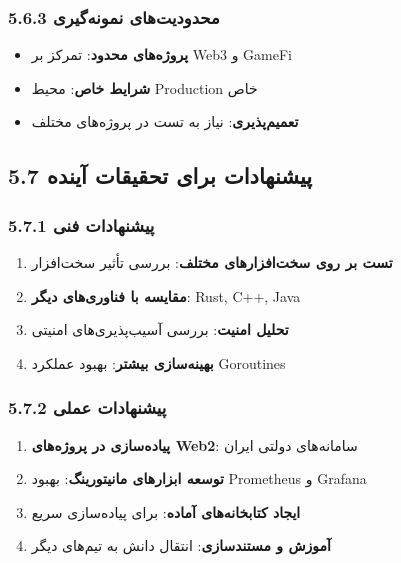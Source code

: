 \documentclass[
]{article}
\providecommand{\tightlist}{%
  \setlength{\itemsep}{0pt}\setlength{\parskip}{0pt}}
\begin{document}
\subsubsection{5.6.3 محدودیت‌های
نمونه‌گیری}\label{ux645ux62dux62fux648ux62fux6ccux62aux647ux627ux6cc-ux646ux645ux648ux646ux647ux6afux6ccux631ux6cc}

\begin{itemize}
\tightlist
\item
  \textbf{پروژه‌های محدود}: تمرکز بر Web3 و GameFi
\item
  \textbf{شرایط خاص}: محیط Production خاص
\item
  \textbf{تعمیم‌پذیری}: نیاز به تست در پروژه‌های مختلف
\end{itemize}

\subsection{5.7 پیشنهادات برای تحقیقات
آینده}\label{ux67eux6ccux634ux646ux647ux627ux62fux627ux62a-ux628ux631ux627ux6cc-ux62aux62dux642ux6ccux642ux627ux62a-ux622ux6ccux646ux62fux647}

\subsubsection{5.7.1 پیشنهادات
فنی}\label{ux67eux6ccux634ux646ux647ux627ux62fux627ux62a-ux641ux646ux6cc}

\begin{enumerate}
\def\labelenumi{\arabic{enumi}.}
\tightlist
\item
  \textbf{تست بر روی سخت‌افزارهای مختلف}: بررسی تأثیر سخت‌افزار
\item
  \textbf{مقایسه با فناوری‌های دیگر}: Rust, C++, Java
\item
  \textbf{تحلیل امنیت}: بررسی آسیب‌پذیری‌های امنیتی
\item
  \textbf{بهینه‌سازی بیشتر}: بهبود عملکرد Goroutines
\end{enumerate}

\subsubsection{5.7.2 پیشنهادات
عملی}\label{ux67eux6ccux634ux646ux647ux627ux62fux627ux62a-ux639ux645ux644ux6cc}

\begin{enumerate}
\def\labelenumi{\arabic{enumi}.}
\tightlist
\item
  \textbf{پیاده‌سازی در پروژه‌های Web2}: سامانه‌های دولتی ایران
\item
  \textbf{توسعه ابزارهای مانیتورینگ}: بهبود Prometheus و Grafana
\item
  \textbf{ایجاد کتابخانه‌های آماده}: برای پیاده‌سازی سریع
\item
  \textbf{آموزش و مستندسازی}: انتقال دانش به تیم‌های دیگر
\end{enumerate}
\end{document}

